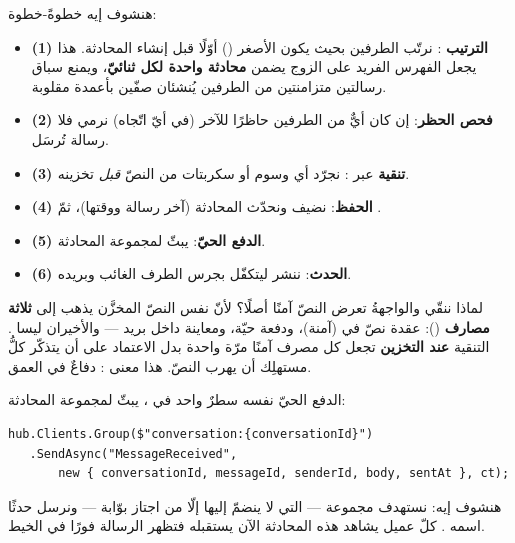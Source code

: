 هنشوف إيه خطوةً-خطوة:
\begin{itemize}
\item \textbf{(1) الترتيب }: نرتّب الطرفين بحيث يكون الأصغر
  () أوّلًا قبل إنشاء المحادثة. هذا يجعل الفهرس الفريد على الزوج
  يضمن \textbf{محادثة واحدة لكل ثنائيّ}، ويمنع سباق رسالتين متزامنتين من الطرفين
  يُنشئان صفّين بأعمدة مقلوبة.
\item \textbf{(2) فحص الحظر}: إن كان أيٌّ من الطرفين حاظرًا للآخر (في أيّ اتّجاه)
  نرمي  فلا رسالة تُرسَل.
\item \textbf{(3) تنقية } عبر : نجرّد أي وسوم أو سكربتات
  من النصّ \emph{قبل} تخزينه.
\item \textbf{(4) الحفظ}: نضيف  ونحدّث المحادثة (آخر رسالة
  ووقتها)، ثمّ .
\item \textbf{(5) الدفع الحيّ}:  يبثّ لمجموعة المحادثة.
\item \textbf{(6) الحدث}: ننشر  ليتكفّل بجرس الطرف
  الغائب وبريده.
\end{itemize}

\begin{secnote}
لماذا ننقّي  والواجهةُ  تعرض النصّ آمنًا أصلًا؟ لأنّ نفس النصّ
المخزَّن يذهب إلى \textbf{ثلاثة مصارف} (): عقدة نصّ في 
(آمنة)، ودفعة  حيّة، ومعاينة داخل بريد  — والأخيران ليسا
. التنقية \textbf{عند التخزين} تجعل كل مصرف آمنًا مرّة واحدة بدل الاعتماد
على أن يتذكّر كلُّ مستهلِك أن يهرب النصّ. هذا معنى : دفاعٌ في العمق.
\end{secnote}

الدفع الحيّ نفسه سطرٌ واحد في ، يبثّ لمجموعة المحادثة:

\begin{english}
\begin{lstlisting}[language={[Sharp]C}]
hub.Clients.Group($"conversation:{conversationId}")
   .SendAsync("MessageReceived",
       new { conversationId, messageId, senderId, body, sentAt }, ct);
\end{lstlisting}
\end{english}

هنشوف إيه: نستهدف مجموعة  — التي لا ينضمّ إليها إلّا من
اجتاز بوّابة  — ونرسل حدثًا اسمه .
كلّ عميل يشاهد هذه المحادثة الآن يستقبله فتظهر الرسالة فورًا في الخيط.

